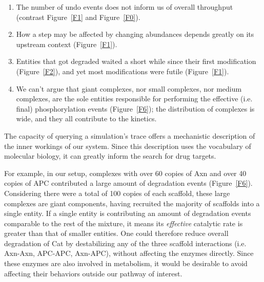 \begin{enumerate}
\item The number of undo events does not inform us of overall
  throughput (contrast Figure~\ref{F1} and Figure~\ref{F0}).
\item How a step may be affected by changing abundances depends
  greatly on its upstream context (Figure~\ref{F1}).
\item Entities that got degraded waited a short while since their
  first modification (Figure~\ref{F2}), and yet most modifications
  were futile (Figure~\ref{F1}).
\item We can't argue that giant complexes, nor small complexes, nor
  medium complexes, are the sole entities responsible for performing
  the effective (i.e. final) phosphorylation events  (Figure~\ref{F6}); %
  the distribution of complexes is wide, and they all contribute to
  the kinetics.
\end{enumerate}

The capacity of querying a simulation's trace offers a mechanistic description of the inner workings of our system. Since this description uses the vocabulary of molecular biology, it can greatly inform the search for drug targets. 

For example, in our setup, complexes with over 60 copies of Axn and over 40 copies of APC contributed a large amount of degradation events (Figure~\ref{F6}). Considering there were a total of 100 copies of each scaffold, these large complexes are giant components, having recruited the majority of scaffolds into a single entity. If a single entity is contributing an amount of degradation events comparable to the rest of the mixture, it means its \emph{effective} catalytic rate is greater than that of smaller entities. One could therefore reduce overall degradation of Cat by destabilizing any of the three scaffold interactions (i.e. Axn-Axn, APC-APC, Axn-APC), without affecting the enzymes directly. Since these enzymes are also involved in metabolism, it would be desirable to avoid affecting their behaviors outside our pathway of interest.